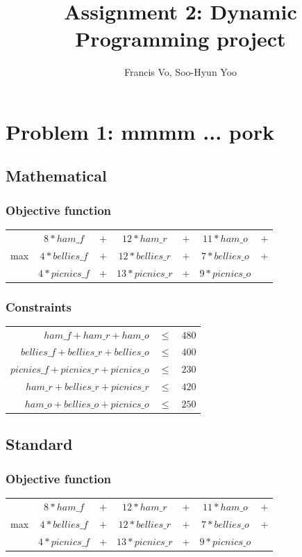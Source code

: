 \documentclass[a4paper,10pt]{article}
\title{Assignment 2: Dynamic Programming project}
\author{Francis Vo, Soo-Hyun Yoo}
\begin{document}
	\maketitle

	\section{Problem 1: mmmm ... pork}
	\subsection{Mathematical}
\subsubsection{Objective function} 
\begin{tabular}{ccccccc}
&$8 * ham\_f $& $+$& $ 12 * ham\_r$& $ + $& $11 * ham\_o$& $+ $\\
max &$4 * bellies\_f $& $+ $& $12 * bellies\_r$& $ + $& $7 * bellies\_o$& $ +$\\
&$4 * picnics\_f $& $+ $& $13 * picnics\_r $& $+$& $ 9 * picnics\_o$
\end{tabular}


\subsubsection{Constraints} 
\begin{tabular}{rcl}
 $ham\_f + ham\_r + ham\_o$& $\le$ &$480$\\
$bellies\_f + bellies\_r + bellies\_o$ &$ \le$ &$ 400$\\
$picnics\_f + picnics\_r + picnics\_o$ &$ \le$ &$ 230$\\
$ham\_r + bellies\_r + picnics\_r$ &$\le $ &$420$\\
$ham\_o + bellies\_o + picnics\_o $ &$\le$ &$ 250$\\
\end{tabular}

	\subsection{Standard}
\subsubsection{Objective function} 
\begin{tabular}{ccccccc}
&$8 * ham\_f $& $+$& $ 12 * ham\_r$& $ + $& $11 * ham\_o$& $+ $\\
max &$4 * bellies\_f $& $+ $& $12 * bellies\_r$& $ + $& $7 * bellies\_o$& $ +$\\
&$4 * picnics\_f $& $+ $& $13 * picnics\_r $& $+$& $ 9 * picnics\_o$
\end{tabular}
\end{document}
